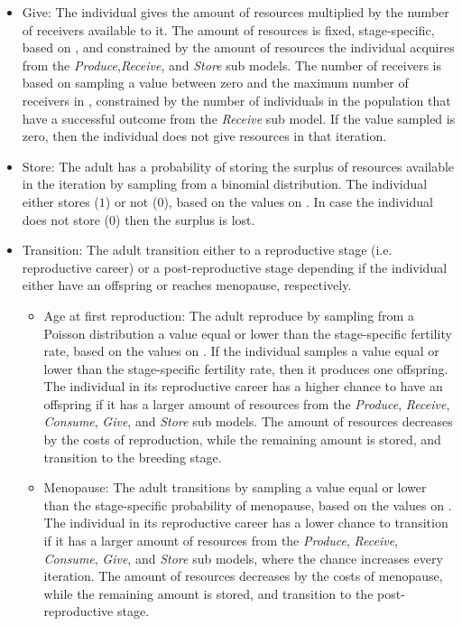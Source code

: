\documentclass{article}
\begin{document}
\begin{itemize}
\begin{itemize}
        \item Give: The individual gives the amount of resources multiplied by the number of receivers available to it. The amount of resources is fixed, stage-specific, based on \cite{gurven2004give}, and constrained by the amount of resources the individual acquires from the \emph{Produce},\emph{Receive}, and \emph{Store} sub models. The number of receivers is based on sampling a value between zero and the maximum number of receivers in \cite{gurven2004give}, constrained by the number of individuals in the population that have a successful outcome from the \emph{Receive} sub model. If the value sampled is zero, then the individual does not give resources in that iteration.
        \item Store: The adult has a probability of storing the surplus of resources available in the iteration by sampling from a binomial distribution. The individual either stores ($1$) or not ($0$), based on the values on \citep{bowles2011cultivation}. In case the individual does not store ($0$) then the surplus is lost.
        \item Transition: The adult transition either to a reproductive stage (i.e. reproductive career) or a post-reproductive stage depending if the individual either have an offspring or reaches menopause, respectively.
        \begin{itemize}
            \item Age at first reproduction: The adult reproduce by sampling from a Poisson distribution a value equal or lower than the stage-specific fertility rate, based on the values on \citep{wood2017dynamics}. If the individual samples a value equal or lower than the stage-specific fertility rate, then it produces one offspring. The individual in its reproductive career has a higher chance to have an offspring if it has a larger amount of resources from the \emph{Produce}, \emph{Receive}, \emph{Consume}, \emph{Give}, and \emph{Store} sub models. The amount of resources decreases by the costs of reproduction, while the remaining amount is stored, and transition to the breeding stage.
            \item Menopause: The adult transitions by sampling a value equal or lower than the stage-specific probability of menopause, based on the values on \citep{laisk2019demographic}. The individual in its reproductive career has a lower chance to transition if it has a larger amount of resources from the \emph{Produce}, \emph{Receive}, \emph{Consume}, \emph{Give}, and \emph{Store} sub models, where the chance increases every iteration. The amount of resources decreases by the costs of menopause, while the remaining amount is stored, and transition to the post-reproductive stage.

\end{itemize}
\end{itemize}
\end{itemize}
\end{document}
